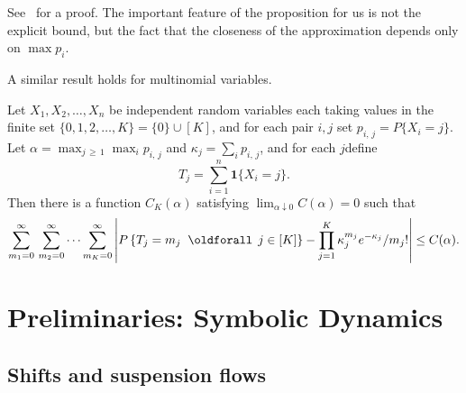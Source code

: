 \documentclass[10pt]{amsart}
\theoremstyle{definition}\newtheorem{defi}[theo]{Definition}\newtheorem{rema}[theo]{Remark}\newtheorem{exam}[theo]{Example}\newtheorem{exem}[theo]{Example}\newtheorem{nota}[theo]{Notation}
\renewcommand*{\forall}{\mathrel{\oldforall}}
\begin{document}
See~\cite{lecam} for a proof. The important feature of the proposition for us is not the explicit bound, but the fact that the closeness of the approximation depends only on $\max p_{i}$.

A similar result holds for multinomial variables.

\begin{prop}\label{proposition:mult-lsn}
Let $X_{1},X_{2},\dotsc,X_{n}$ be independent random variables each taking values in the finite set $\{0,1,2,\dotsc,K \}=\{0\} \cup [K]$, and for each pair $i,j$ set $p_{i,\,j}=P\{X_{i}=j \}$. Let $\alpha =\max_{j\,\geq\,1}\max_{i}p_{i,\,j}$ and $\kappa_{j}=\sum_{i}p_{i,\,j}$, and for each $j$define
\[
T_{j}=\sum_{i=1}^{n}\mathbf{1}\{X_{i}=j \}.
\]
Then there is a function $C_{K} (\alpha)$ satisfying $\lim_{\alpha \downarrow 0}C (\alpha)=0$ such that
\[
\sum_{m_{1}=0}^{\infty}\,\sum_{m_{2}=0}^{\infty}\dotsb
\sum_{m_{K}=0}^{\infty}
\left\lvert P\left\{T_{j}=m_{j} \;\forall \, j\in [K]\right\} -\prod_{j=1}^{K}\kappa_{j}^{m_{j}}e^{-\kappa_{j}}/m_{j}! \right\rvert \leq C (\alpha).
\]
\end{prop}



\section{Preliminaries: Symbolic Dynamics}\label{sec:symbolicDynamics}

\subsection{Shifts and suspension flows}\label{ssec:suspFlows}
\end{document}
